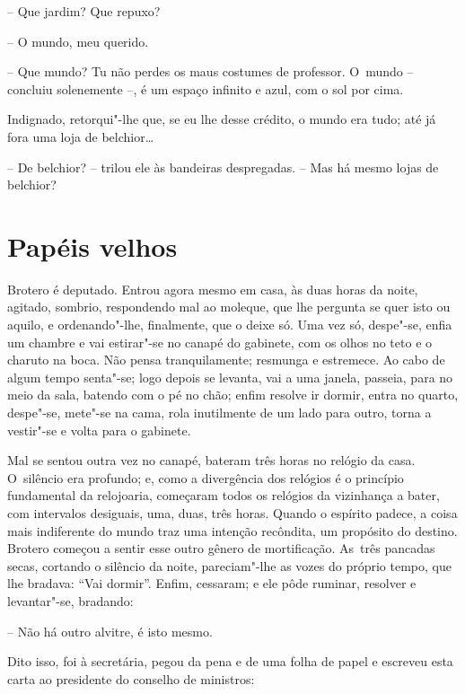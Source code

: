 -- Que jardim? Que repuxo?

-- O mundo, meu querido.

-- Que mundo? Tu não perdes os maus costumes de professor. O~mundo --
concluiu solenemente --, é um espaço infinito e azul, com o sol por
cima.

Indignado, retorqui"-lhe que, se eu lhe desse crédito, o mundo era tudo;
até já fora uma loja de belchior\ldots{}

-- De belchior? -- trilou ele às bandeiras despregadas. -- Mas há mesmo
lojas de belchior?

\chapter{Papéis velhos}

Brotero é deputado. Entrou agora mesmo em casa, às duas horas da noite,
agitado, sombrio, respondendo mal ao moleque, que lhe pergunta se quer
isto ou aquilo, e ordenando"-lhe, finalmente, que o deixe só. Uma vez só,
despe"-se, enfia um chambre e vai estirar"-se no canapé do gabinete, com
os olhos no teto e o charuto na boca. Não pensa tranquilamente; resmunga
e estremece. Ao cabo de algum tempo senta"-se; logo depois se levanta,
vai a uma janela, passeia, para no meio da sala, batendo com o pé no
chão; enfim resolve ir dormir, entra no quarto, despe"-se, mete"-se na
cama, rola inutilmente de um lado para outro, torna a vestir"-se e volta
para o gabinete.

Mal se sentou outra vez no canapé, bateram três horas no relógio da
casa. O~silêncio era profundo; e, como a divergência dos relógios é o
princípio fundamental da relojoaria, começaram todos os relógios da
vizinhança a bater, com intervalos desiguais, uma, duas, três horas.
Quando o espírito padece, a coisa mais indiferente do mundo traz uma
intenção recôndita, um propósito do destino. Brotero começou a sentir
esse outro gênero de mortificação. As~três pancadas secas, cortando o
silêncio da noite, pareciam"-lhe as vozes do próprio tempo, que lhe
bradava: ``Vai dormir''. Enfim, cessaram; e ele pôde ruminar, resolver e
levantar"-se, bradando:

-- Não há outro alvitre, é isto mesmo.

Dito isso, foi à secretária, pegou da pena e de uma folha de papel e
escreveu esta carta ao presidente do conselho de ministros:

\bigskip

